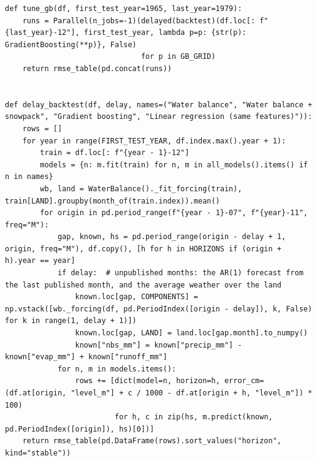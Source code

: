\documentclass{article}
\begin{document}
\begin{lstlisting}[caption={Rolling-origin backtest, RMSE, the bootstrap, tuning gradient boosting and data delays}]
def tune_gb(df, first_test_year=1965, last_year=1979):
    runs = Parallel(n_jobs=-1)(delayed(backtest)(df.loc[: f"{last_year}-12"], first_test_year, lambda p=p: {str(p): GradientBoosting(**p)}, False)
                               for p in GB_GRID)
    return rmse_table(pd.concat(runs))


def delay_backtest(df, delay, names=("Water balance", "Water balance + snowpack", "Gradient boosting", "Linear regression (same features)")):
    rows = []
    for year in range(FIRST_TEST_YEAR, df.index.max().year + 1):
        train = df.loc[: f"{year - 1}-12"]
        models = {n: m.fit(train) for n, m in all_models().items() if n in names}
        wb, land = WaterBalance()._fit_forcing(train), train[LAND].groupby(month_of(train.index)).mean()
        for origin in pd.period_range(f"{year - 1}-07", f"{year}-11", freq="M"):
            gap, known, hs = pd.period_range(origin - delay + 1, origin, freq="M"), df.copy(), [h for h in HORIZONS if (origin + h).year == year]
            if delay:  # unpublished months: the AR(1) forecast from the last published month, and the average weather over the land
                known.loc[gap, COMPONENTS] = np.vstack([wb._forcing(df, pd.PeriodIndex([origin - delay]), k, False) for k in range(1, delay + 1)])
                known.loc[gap, LAND] = land.loc[gap.month].to_numpy()
                known["nbs_mm"] = known["precip_mm"] - known["evap_mm"] + known["runoff_mm"]
            for n, m in models.items():
                rows += [dict(model=n, horizon=h, error_cm=(df.at[origin, "level_m"] + c / 1000 - df.at[origin + h, "level_m"]) * 100)
                         for h, c in zip(hs, m.predict(known, pd.PeriodIndex([origin]), hs)[0])]
    return rmse_table(pd.DataFrame(rows).sort_values("horizon", kind="stable"))
\end{lstlisting}
\end{document}
